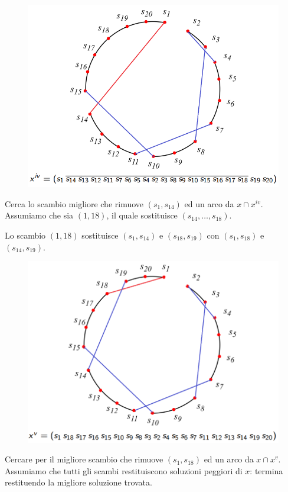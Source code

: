 \documentclass{article}
\begin{document}
\begin{figure}[H]
    \centering
    \includegraphics[scale=0.4]{images/exampl_kernig5.png}
\end{figure}
Cerca lo scambio migliore che rimuove $(s_1,s_{14})$ ed un arco da
$x\cap x^{iv}$. Assumiamo che sia $(1,18)$, il quale sostituisce
$(s_{14},\dots,s_{18})$.

Lo scambio $(1,18)$ sostituisce $(s_1,s_{14})$ e $(s_{18},s_{19})$ con
$(s_1,s_{18})$ e $(s_{14},s_{19})$.

\begin{figure}[H]
    \centering
    \includegraphics[scale=0.4]{images/exampl_kernig6.png}
\end{figure}
Cercare per il migliore scambio che rimuove $(s_1,s_{18})$ ed un arco
da $x\cap x^v$. Assumiamo che tutti gli scambi restituiscono soluzioni
peggiori di $x$: termina restituendo la migliore soluzione trovata.
\end{document}
